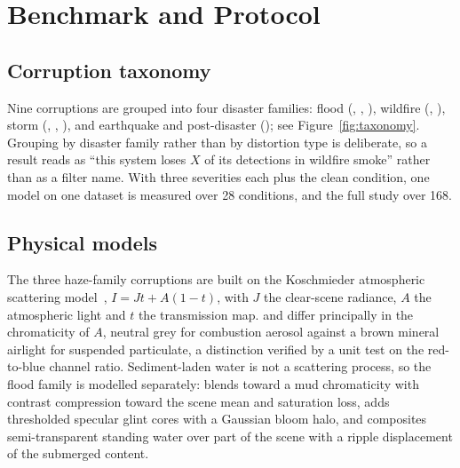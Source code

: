 \section{Benchmark and Protocol}
\label{sec:benchmark}

\subsection{Corruption taxonomy}

Nine corruptions are grouped into four disaster families: flood
(, , ), wildfire
(, ), storm (,
, ), and earthquake and post-disaster
(); see Figure~\ref{fig:taxonomy}. Grouping by disaster
family rather than by distortion type is deliberate, so a result reads
as ``this system loses $X$ of its detections in wildfire smoke'' rather
than as a filter name. With three severities each plus the clean
condition, one model on one dataset is measured over 28 conditions, and
the full study over 168.

\subsection{Physical models}

The three haze-family corruptions are built on the Koschmieder
atmospheric scattering model~\cite{koschmieder1924theorie,narasimhan2002vision},
$I = Jt + A(1-t)$, with $J$ the clear-scene radiance, $A$ the
atmospheric light and $t$ the transmission map.  and
 differ principally in the chromaticity of $A$, neutral
grey for combustion aerosol against a brown mineral airlight for
suspended particulate, a distinction verified by a unit test on the
red-to-blue channel ratio. Sediment-laden water is not a scattering
process, so the flood family is modelled separately: 
blends toward a mud chromaticity with contrast compression toward the
scene mean and saturation loss,  adds thresholded
specular glint cores with a Gaussian bloom halo, and 
composites semi-transparent standing water over part of the scene with a
ripple displacement of the submerged content.

